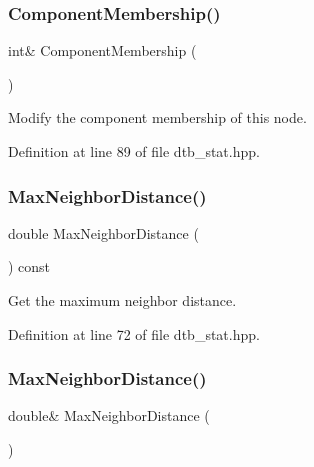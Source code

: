 \subsubsection{Component\+Membership()\hspace{0.1cm}{\footnotesize\ttfamily [2/2]}}
{\footnotesize\ttfamily int\& Component\+Membership (\begin{DoxyParamCaption}{ }\end{DoxyParamCaption})\hspace{0.3cm}{\ttfamily [inline]}}



Modify the component membership of this node. 



Definition at line 89 of file dtb\+\_\+stat.\+hpp.

\mbox{\label{classmlpack_1_1emst_1_1DTBStat_a4d4e97c209c9d20ab2214ebea3888c01}} 
\subsubsection{Max\+Neighbor\+Distance()\hspace{0.1cm}{\footnotesize\ttfamily [1/2]}}
{\footnotesize\ttfamily double Max\+Neighbor\+Distance (\begin{DoxyParamCaption}{ }\end{DoxyParamCaption}) const\hspace{0.3cm}{\ttfamily [inline]}}



Get the maximum neighbor distance. 



Definition at line 72 of file dtb\+\_\+stat.\+hpp.

\mbox{\label{classmlpack_1_1emst_1_1DTBStat_abcf9c2e19fb0a9c1d95dea5d09e04262}} 
\subsubsection{Max\+Neighbor\+Distance()\hspace{0.1cm}{\footnotesize\ttfamily [2/2]}}
{\footnotesize\ttfamily double\& Max\+Neighbor\+Distance (\begin{DoxyParamCaption}{ }\end{DoxyParamCaption})\hspace{0.3cm}{\ttfamily [inline]}}



